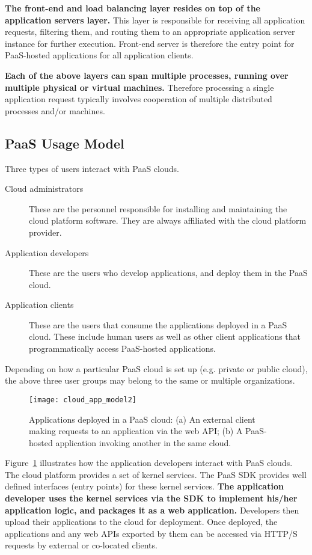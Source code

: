 \textbf{The front-end and load balancing layer resides on top of the application servers layer.} 
This layer is responsible
for receiving all application requests, filtering them, and routing them to an appropriate application
server instance for further execution. Front-end server is therefore the entry point for PaaS-hosted
applications for all application clients.

\textbf{Each of the above layers can span multiple processes, running over multiple physical or virtual
machines.} Therefore processing a single application request typically involves cooperation
of multiple distributed processes and/or machines.

\subsection{PaaS Usage Model}

Three types of users interact with PaaS clouds.
\begin{description}
\item[Cloud administrators] These are the personnel responsible for installing and maintaining the
cloud platform software. They are always affiliated with the cloud platform provider.
\item[Application developers] These are the users who develop applications, and deploy them
in the PaaS cloud.
\item[Application clients] These are the users that consume the applications deployed in a PaaS cloud.
These include human users as well as other client applications that programmatically access
PaaS-hosted applications.
\end{description}
Depending on how a particular PaaS cloud is set up (e.g. private or public cloud), the above three user groups
may belong to the same or multiple organizations.

\begin{figure}
\centering
\texttt{[image: cloud\_app\_model2]}
\caption{Applications deployed in a PaaS cloud: (a) An external client making requests
to an application via the web API;
(b) A PaaS-hosted application invoking another in the same cloud.
\label{fig:cloud_app_model}
}
\end{figure}

Figure~\ref{fig:cloud_app_model} illustrates how the application developers
interact with PaaS clouds. The cloud platform provides a set of kernel services. 
The PaaS SDK provides well defined interfaces (entry points) for these kernel services.  
\textbf{The application developer uses the kernel services via the SDK to implement his/her application logic, and packages 
it as a web application.} Developers then upload their applications to the cloud for deployment.
Once deployed, the applications and any web APIs exported by them can be accessed 
via HTTP/S requests by external or co-located clients.

